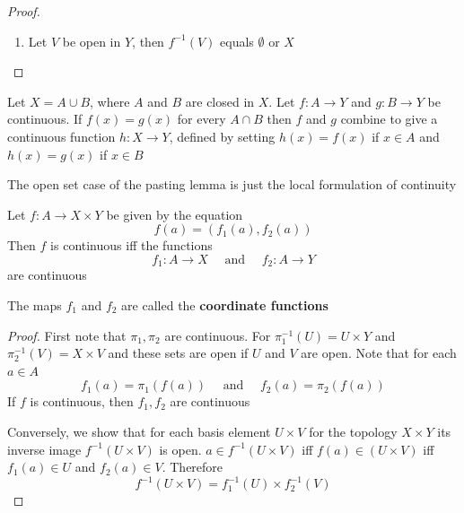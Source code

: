 \documentclass[11pt]{article}
\begin{document}
\begin{proof}
\begin{enumerate}
\item Let \(V\) be open in \(Y\), then \(f^{-1}(V)\) equals \(\emptyset\) or \(X\)
\end{enumerate}
\end{proof}

\begin{theorem}
Let \(X=A\cup B\), where \(A\) and \(B\) are closed in \(X\). Let \(f:A\to Y\) and \(g:B\to Y\) be
continuous. If \(f(x)=g(x)\) for every \(A\cap B\) then \(f\) and \(g\) combine to give a continuous
function \(h:X\to Y\), defined by setting \(h(x)=f(x)\) if \(x\in A\) and \(h(x)=g(x)\) if \(x\in B\)
\end{theorem}

The open set case of the pasting lemma is just the local formulation of continuity

\begin{theorem}
\label{thm18.4}
Let \(f:A\to X\times Y\) be given by the equation
\begin{equation*}
f(a)=(f_1(a),f_2(a))
\end{equation*}
Then \(f\) is continuous iff the functions
\begin{equation*}
f_1:A\to X \quad\text{ and }\quad f_2:A\to Y
\end{equation*}
are continuous

The maps \(f_1\) and \(f_2\) are called the \textbf{coordinate functions}
\end{theorem}

\begin{proof}
First note that \(\pi_1,\pi_2\) are continuous. For \(\pi_1^{-1}(U)=U\times Y\) and \(\pi_2^{-1}(V)=X\times V\) and
these sets are open if \(U\) and \(V\) are open. Note that for each \(a\in A\)
\begin{equation*}
f_1(a)=\pi_1(f(a))\quad\text{ and }\quad f_2(a)=\pi_2(f(a))
\end{equation*}
If \(f\) is continuous, then \(f_1,f_2\) are continuous

Conversely, we show that for each basis element \(U\times V\) for the topology \(X\times Y\) its inverse
image \(f^{-1}(U\times V)\) is open. \(a\in f^{-1}(U\times V)\) iff \(f(a)\in(U\times V)\) iff \(f_1(a)\in U\)
and \(f_2(a)\in V\). Therefore
\begin{equation*}
f^{-1}(U\times V)=f_1^{-1}(U)\times f_2^{-1}(V)
\end{equation*}
\end{proof}
\end{document}
